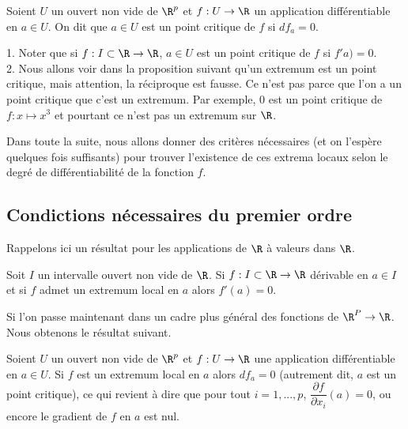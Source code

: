 \documentclass[12pt, class=report,crop=false]{standalone}
\begin{document}
{\begin{definition}
\textcolor[rgb]{0.98,0.00,0.00}{
  Soient $U$ un ouvert non vide de $\R^p$ et $f: U  \rightarrow \R$ un application différentiable en  $a \in U$. On dit que $a \in U$ est un point critique de $f$
  si $df_a=0$.}
\end{definition}

\begin{remarque*} $ $\\
\textcolor[rgb]{0.00,0.00,1.00}{
1. Noter que si $f: I \subset \R \rightarrow \R$, $a \in U$ est un point critique de $f$ si $f'a)=0$. \\
2. Nous allons voir dans la proposition suivant qu'un extremum est un point critique, mais attention, la réciproque est fausse. 
Ce n'est pas parce que l'on a un point critique que c'est un extremum. Par exemple, $0$ est un point critique de $f: x \mapsto x^3$ et pourtant ce n'est pas un extremum sur $\R$.
}
\end{remarque*}

\noindent Dans toute la suite, nous allons donner des critères nécessaires (et on l'espère quelques fois suffisants) pour trouver l'existence de ces extrema locaux selon le degré de différentiabilité de la fonction $f$.
\subsection{Condictions nécessaires du premier ordre}
\noindent Rappelons ici un résultat pour les applications de $\R$  à valeurs dans $\R$.

\begin{proposition}
\textcolor[rgb]{0.44,0.00,0.87}{
 Soit $I$ un intervalle ouvert non vide de $\R$. Si $f: I \subset \R \rightarrow \R$ dérivable en $a \in I$
et si $f$ admet un extremum local en $a$ alors $f'(a)=0$.  }
\end{proposition}

\noindent Si l'on passe maintenant dans un cadre plus général des fonctions de $\R^P \rightarrow \R$. Nous obtenons le résultat suivant.

\begin{proposition}
\textcolor[rgb]{0.44,0.00,0.87}{
 Soient $U$ un ouvert non vide de $\R^p$ et $f: U  \rightarrow \R$ une application différentiable en $a \in U$. Si $f$ est un extremum local en $a$ alors  $df_a=0$ (autrement dit, $a$ est un point critique), ce qui revient à dire que pour tout $i=1,...,p$, $\dfrac{\partial f}{\partial x_i}(a)=0$, ou encore le gradient de $f$ en $a$ est nul.}
\end{proposition}

}
\end{document}
